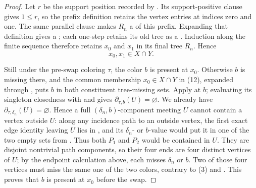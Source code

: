 \begin{proof}
Let $r$ be the support position recorded by .
Its support-positive clause gives $1\leq r$, so the prefix definition
 retains the vertex entries at indices zero
and one.  The same parallel clause makes $R_n$ a
 of this prefix.  Expanding that definition gives
a ; each one-step
 retains its old tree as a
.  Induction along the finite sequence
therefore retains $x_0$ and $x_1$ in its final tree $R_n$.  Hence
  \[
                           x_0,x_1\in X\cap Y.                  \tag{12}
  \]

  Still under the pre-swap coloring $\tau$, the color $b$ is present at
  $x_0$.  Otherwise $b$ is missing there, and the common membership
  $x_0\in X\cap Y$ in (12), expanded through
  , puts $b$ in both constituent tree-missing
  sets.  Apply  at $b$; evaluating
  its singleton closedness with  and
   gives
  $\partial_{\tau,b}(U)=\varnothing$.  We already have
  $\partial_{\tau,\delta_n}(U)=\varnothing$.  Hence a full
  $(\delta_n,b)$-component meeting $U$ cannot contain a vertex outside
  $U$: along any incidence path to an outside vertex, the first exact edge
  identity leaving $U$ lies in , and its
  $\delta_n$- or $b$-value would put it in one of the two empty sets from
  .  Thus both $P_1$ and $P_2$ would be
  contained in $U$.  They are disjoint nontrivial path components, so their
  four ends are four distinct vertices of $U$; by the endpoint calculation
  above, each misses $\delta_n$ or $b$.  Two of those four vertices must
  miss the same one of the two colors, contrary to (3) and
  .  This proves that $b$ is present
  at $x_0$ before the swap.


\end{proof}
